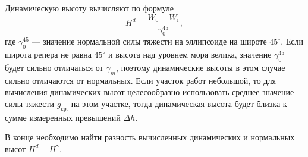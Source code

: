 \documentclass[11pt, a4paper,addpoints]{exam}
\theoremstyle{remark}
\begin{document}
\begin{questions}
    Динамическую высоту вычисляют по формуле
    \begin{equation*}
        H^d = \dfrac{W_0 - W_i}{\gamma_0^{45}},
    \end{equation*}
    где $\gamma_0^{45}$ --- значение нормальной силы тяжести на эллипсоиде на широте $45^\circ$.
    Если широта репера не равна $45^\circ$ и высота над уровнем моря велика, значение
    $\gamma_0^{45}$ будет сильно отличаться от $\gamma_m$, поэтому динамические высоты в этом случае
    сильно отличаются от нормальных. Если участок работ небольшой, то для вычисления динамических
    высот целесообразно использовать среднее значение силы тяжести $g_{\textrm{ср.}}$ на этом
    участке, тогда динамическая высота будет близка к сумме измеренных превышений $\Delta h$.

    В конце необходимо найти разность вычисленных динамических и нормальных высот $H^d - H^\gamma$.
\end{questions}
\end{document}
